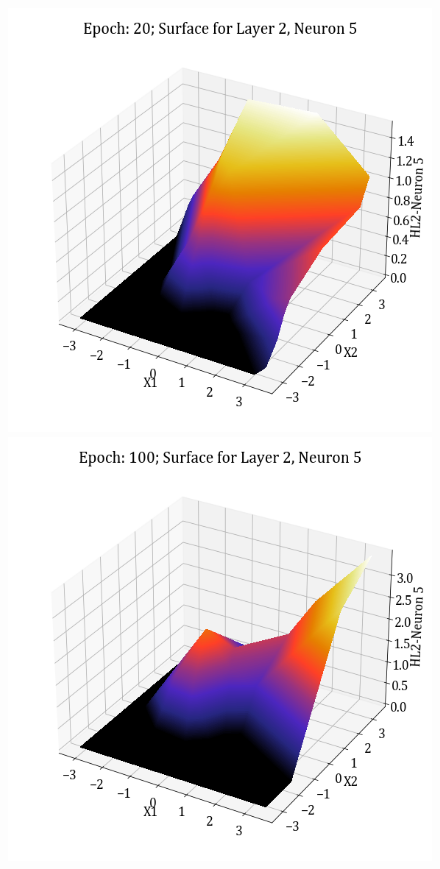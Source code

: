 \documentclass[11pt,a4paper]{article}
\begin{document}
\begin{figure}[H]
    \includegraphics[scale=0.4]{images/1B_MLFFNN_E20_HL2_N5.png}
    \includegraphics[scale=0.4]{images/1B_MLFFNN_E100_HL2_N5.png}

\end{figure}
\end{document}
